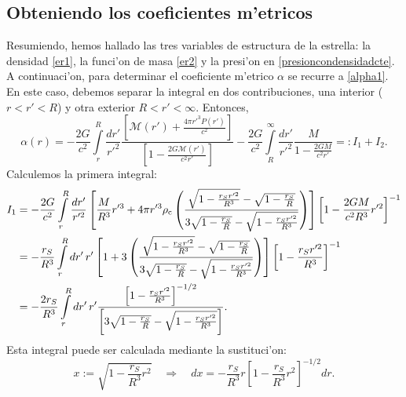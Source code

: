 \subsection{Obteniendo los coeficientes m'etricos}
Resumiendo, hemos hallado las tres variables de estructura de la estrella: la densidad \eqref{er1}, la funci'on de masa \eqref{er2} y la presi'on en \eqref{presioncondensidadcte}. A continuaci'on, para determinar el coeficiente m'etrico $\alpha$ se recurre a \eqref{alpha1}. En este caso, debemos separar la integral en dos contribuciones, una interior ($r<r'<R$) y otra exterior $R<r'<\infty$. Entonces,
\begin{equation}
\alpha(r)=-\frac{2G}{c^2}\int\limits_r^R\frac{dr'}{r'^2}\frac{\left[ \mathcal{M}(r')+\frac{4\pi r'^3P(r')}{c^2}\right]}{\left[ 1-\frac{2G\mathcal{M}(r')}{c^2r'}\right]}
-\frac{2G}{c^2}\int\limits_R^{\infty}\frac{dr'}{r'^2}\frac{M}{1-\frac{2GM}{c^2r'}}=:I_1+I_2.
\end{equation}
Calculemos la primera integral:
\begin{align}
I_1 &=-\frac{2G}{c^2}\int\limits_r^R \frac{dr'}{r'^2}\left[ \frac{M}{R^3}r'^3+4\pi r'^3\rho_{\rm c}\left(\frac{\sqrt{1-\frac{r_Sr'^2}{R^3}}-\sqrt{1-\frac{r_S}{R}}}{ 3 \sqrt{1-\frac{r_S}{R}}-\sqrt{1-\frac{r_Sr'^2}{R^3}}}\right)\right]\left[ 1-\frac{2GM}{c^2R^3}r'^2\right]^{-1}\\
&=-\frac{r_S}{R^3}\int\limits_r^R dr'\,r'\left[ 1+3 \left(\frac{\sqrt{1-\frac{r_Sr'^2}{R^3}}-\sqrt{1-\frac{r_S}{R}}}{ 3 \sqrt{1-\frac{r_S}{R}}-\sqrt{1-\frac{r_Sr'^2}{R^3}}}\right)\right]\left[ 1-\frac{r_Sr'^2}{R^3}\right]^{-1}\\
&=-\frac{2r_S}{R^3}\int\limits_r^R dr'\,r'\frac{\left[ 1-\frac{r_Sr'^2}{R^3}\right]^{-1/2}}{\left[3\sqrt{1-\frac{r_S}{R}}-\sqrt{1-\frac{r_Sr'^2}{R^3}}\right]}.
\end{align}
Esta integral puede ser calculada mediante la sustituci'on:
\begin{equation}
x:=\sqrt{1-\frac{r_S}{R^3}r^2}\quad\Rightarrow\quad dx=-\frac{r_S}{R^3}r\left[1-\frac{r_S}{R^3}r^2\right]^{-1/2}dr.
\end{equation}
